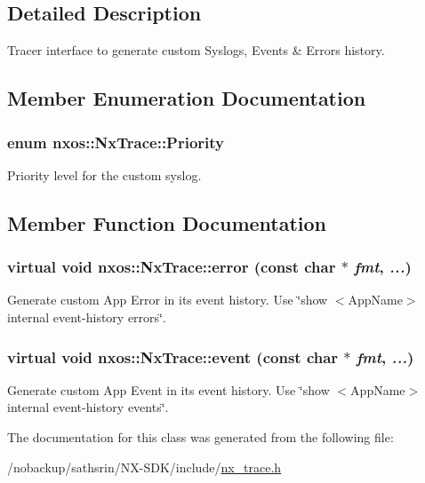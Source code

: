 \subsection{Detailed Description}
Tracer interface to generate custom Syslogs, Events \& Errors history. 

\subsection{Member Enumeration Documentation}
\hypertarget{classnxos_1_1NxTrace_a582f6e5a22e788c61807657f8bca088f}{
\subsubsection[{Priority}]{\setlength{\rightskip}{0pt plus 5cm}enum {\bf nxos::NxTrace::Priority}}}
\label{classnxos_1_1NxTrace_a582f6e5a22e788c61807657f8bca088f}
Priority level for the custom syslog. 

\subsection{Member Function Documentation}
\hypertarget{classnxos_1_1NxTrace_afc0240b6b9a291729836ffb2fbeef8a4}{
\subsubsection[{error}]{\setlength{\rightskip}{0pt plus 5cm}virtual void nxos::NxTrace::error (const char $\ast$ {\em fmt}, \/   {\em ...})}}
\label{classnxos_1_1NxTrace_afc0240b6b9a291729836ffb2fbeef8a4}
Generate custom App Error in its event history. Use \char`\"{}show $<$AppName$>$ internal event-\/history errors\char`\"{}. \hypertarget{classnxos_1_1NxTrace_a22e5e2fff39fae68fba3051dc2720621}{
\subsubsection[{event}]{\setlength{\rightskip}{0pt plus 5cm}virtual void nxos::NxTrace::event (const char $\ast$ {\em fmt}, \/   {\em ...})}}
\label{classnxos_1_1NxTrace_a22e5e2fff39fae68fba3051dc2720621}
Generate custom App Event in its event history. Use \char`\"{}show $<$AppName$>$ internal event-\/history events\char`\"{}. 

The documentation for this class was generated from the following file:\begin{DoxyCompactItemize}
\item 
/nobackup/sathsrin/NX-\/SDK/include/\hyperlink{nx__trace_8h}{nx\_\-trace.h}\end{DoxyCompactItemize}
